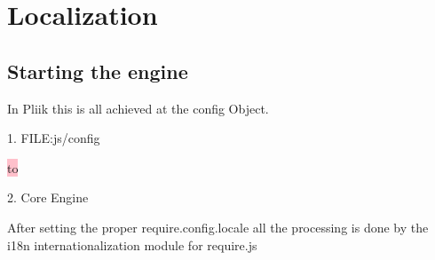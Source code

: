
\section{Localization}


\subsection{Starting the engine}

In Pliik this is all achieved at the config Object.

1. FILE:js/config


\colorbox{pink}{\hbox to \textwidth{

    lang.getActiveCode( config ) \newline

    Search URL, process default \newline

    Set require locale config option

\hfill}}



2. Core Engine

After setting the proper require.config.locale all the
processing is done by the i18n internationalization module for require.js

